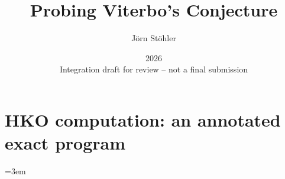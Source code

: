 \documentclass[a4paper,11pt]{article}
\title{Probing Viterbo's Conjecture}
\author{J\"orn St\"ohler}
\date{2026\\Integration draft for review -- not a final submission}
\begin{document}
\maketitle

\begin{abstract}

\end{abstract}



\tableofcontents
\clearpage

















\appendix


\clearpage
\section{HKO computation: an annotated exact program}


\FloatBarrier
\begingroup
\emergencystretch=3em
\printbibliography[heading=bibintoc]
\endgroup
\end{document}
